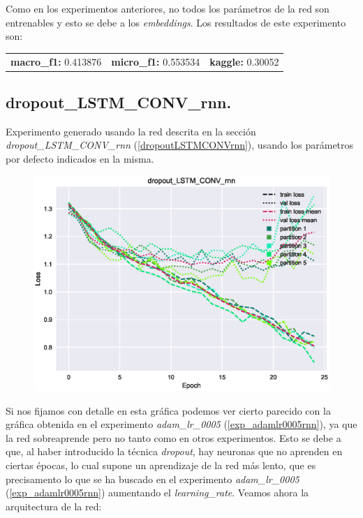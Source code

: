 \documentclass[11pt]{article}
\begin{document}
Como en los experimentos anteriores, no todos los parámetros de la red son entrenables y esto se debe a los \textit{embeddings}. Los resultados de este experimento son: 

\begin{table}[H]
\begin{tabular}{c|c|c}
\textbf{macro\_f1:} 0.413876 & \textbf{micro\_f1:} 0.553534 & \textbf{kaggle:} 0.30052
\end{tabular}
\end{table}

\subsection{dropout\_LSTM\_CONV\_rnn.} \label{exp_dropoutLSTMCONVrnn}

Experimento generado usando la red descrita en la sección \textit{dropout\_LSTM\_CONV\_rnn} (\ref{dropoutLSTMCONVrnn}), usando los parámetros por defecto indicados en la misma. 

\begin{figure}[H]
\includegraphics[width=\linewidth]{images/loss/dropout_LSTM_CONV_rnn-1554211023.eps}
\end{figure}

Si nos fijamos con detalle en esta gráfica podemos ver cierto parecido con la gráfica obtenida en el experimento \textit{adam\_lr\_0005} (\ref{exp_adamlr0005rnn}), ya que la red sobreaprende pero no tanto como en otros experimentos. Esto se debe a que, al haber introducido la técnica \textit{dropout}, hay neuronas que no aprenden en ciertas épocas, lo cual supone un aprendizaje de la red más lento, que es precisamento lo que se ha buscado en el experimento \textit{adam\_lr\_0005} (\ref{exp_adamlr0005rnn}) aumentando el \textit{learning\_rate}. Veamos ahora la arquitectura de la red:
\end{document}
